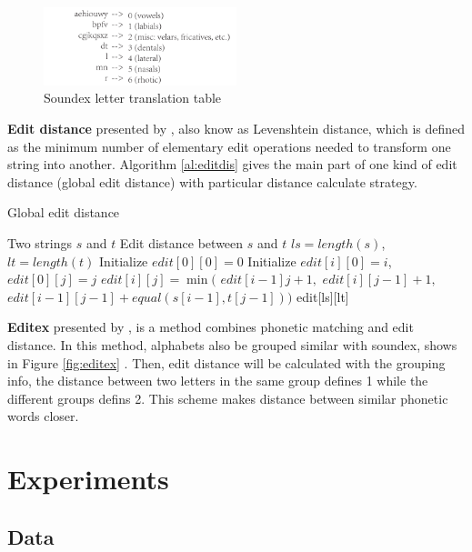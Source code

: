 \documentclass[11pt]{article}
\begin{document}
\begin{figure}
	\centering
	\includegraphics[width=0.5\textwidth]{img/soundex.pdf}
	\caption{Soundex letter translation table}
	\label{fig:soundex}
\end{figure}

\noindent\textbf{Edit distance} presented by \cite{Levenshtein1965Binary},  also know as Levenshtein distance, which is defined as the minimum number of elementary edit operations needed to transform one string into another. Algorithm \ref{al:editdis} gives the main part of one kind of edit distance (global edit distance) with particular distance calculate strategy.

\begin{algorithm}[htb]
	\caption{Global edit distance}
	\label{al:editdis}
	\begin{algorithmic}[1]
		\REQUIRE Two strings $s$ and $t$
		\ENSURE Edit distance between $s$ and $t$
		\STATE $ls = length(s)$, $lt = length(t)$
		\STATE Initialize $edit[0][0]=0$
		\STATE Initialize $edit[i][0]=i$, $edit[0][j]=j$
		\STATE $edit[i][j] = \min($
		\STATE $edit[i-1]j+1, $
		\STATE $edit[i][j-1]+1, $
		\STATE $edit[i-1][j-1]+equal(s[i-1],t[j-1]))$
		\ENDFOR
		\ENDFOR
		\RETURN edit[ls][lt]
	\end{algorithmic}
\end{algorithm}


\noindent\textbf{Editex} presented by \cite{Zobel1996PhoneticSM}, is a method combines phonetic matching and edit distance. In this method, alphabets also be grouped similar with soundex, shows in Figure \ref{fig:editex} . Then, edit distance will be calculated with the grouping info, the distance between two letters in the same group defines 1 while the different groups defins 2. This scheme makes distance between similar phonetic words closer. 

\section{Experiments}

\subsection{Data} 
\end{document}
